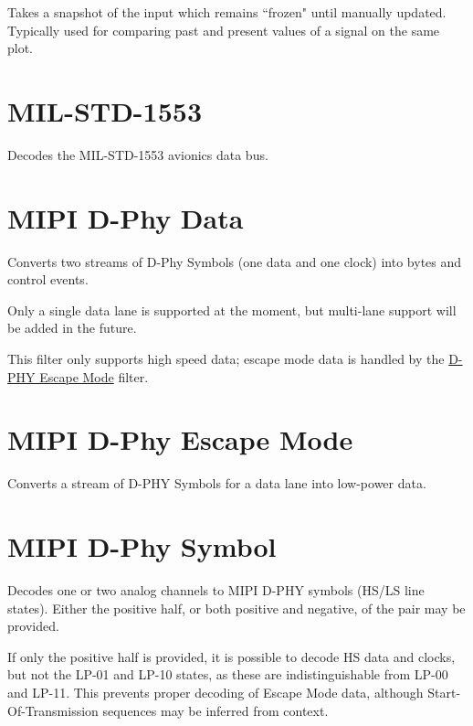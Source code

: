 Takes a snapshot of the input which remains ``frozen" until manually updated. Typically used for comparing past and
present values of a signal on the same plot.

\pagebreak
\section{MIL-STD-1553}

Decodes the MIL-STD-1553 avionics data bus.

\pagebreak
\section{MIPI D-Phy Data}
\label{filter:dphydata}

Converts two streams of D-Phy Symbols (one data and one clock) into bytes and control events.

Only a single data lane is supported at the moment, but multi-lane support will be added in the future.

This filter only supports high speed data; escape mode data is handled by the \hyperref[filter:dphyescape]{D-PHY Escape
Mode} filter.

\pagebreak
\section{MIPI D-Phy Escape Mode}
\label{filter:dphyescape}

Converts a stream of D-PHY Symbols for a data lane into low-power data.

\pagebreak
\section{MIPI D-Phy Symbol}

Decodes one or two analog channels to MIPI D-PHY symbols (HS/LS line states). Either the positive half, or both
positive and negative, of the pair may be provided.

If only the positive half is provided, it is possible to decode HS data and clocks, but not the LP-01 and LP-10 states,
as these are indistinguishable from LP-00 and LP-11. This prevents proper decoding of Escape Mode data, although
Start-Of-Transmission sequences may be inferred from context.

